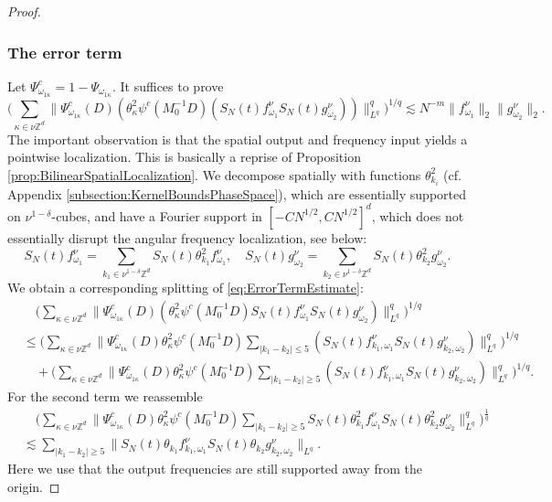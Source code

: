 \documentclass{amsart}
\numberwithin{equation}{section}
\theoremstyle{definition}
\newcommand{\Z}{\mathbb{Z}}
\begin{document}
\begin{proof}
\subsubsection*{The error term}

Let $\Psi_{\omega_{1 \kappa}}^c = 1-\Psi_{\omega_{1 \kappa}}$. It suffices to prove
\begin{equation}
\label{eq:ErrorTermEstimate}
   \big( \sum_{\kappa \in \nu \Z^d} \| \Psi_{\omega_{1 \kappa}}^{c}(D) (\theta_{\kappa}^2 \psi^c(M_0^{-1}D) (S_N(t) f_{\omega_1}^{\nu} S_N(t) g_{\omega_2}^{\nu} )) \|^q_{L^q} \big)^{1/q} \lesssim N^{-m} \| f_{\omega_1}^{\nu} \|_2 \| g_{\omega_2}^{\nu} \|_2.
\end{equation}
The important observation is that the spatial output and frequency input yields a pointwise localization. This is basically a reprise of Proposition \ref{prop:BilinearSpatialLocalization}. We decompose spatially with functions $\theta_{k_i}^2$ (cf. Appendix \ref{subsection:KernelBoundsPhaseSpace}), which are essentially supported on $\nu^{1-\delta}$-cubes, and have a Fourier support in $[-CN^{1/2},CN^{1/2}]^d$, which does not essentially disrupt the angular frequency localization, see below:
\begin{equation*}
    S_N(t) f_{\omega_1}^{\nu} = \sum_{k_1 \in \nu^{1-\delta} \Z^d} S_N(t) \theta_{k_1}^2 f_{\omega_1}^{\nu}, \quad S_N(t) g_{\omega_2}^{\nu} = \sum_{k_2 \in \nu^{1-\delta} \Z^{d}} S_N(t) \theta_{k_2}^2 g_{\omega_2}^{\nu}.
\end{equation*}
We obtain a corresponding splitting of \eqref{eq:ErrorTermEstimate}:
\begin{equation*}
\begin{split}
   &\quad \big( \sum_{\kappa \in \nu \Z^d} \| \Psi_{\omega_{1 \kappa}}^{c}(D) (\theta_{\kappa}^2 \psi^c(M_0^{-1}D) S_N(t) f_{\omega_1}^{\nu} S_N(t) g_{\omega_2}^{\nu} ) \|^q_{L^q} \big)^{1/q} \\
&\leq \big( \sum_{\kappa \in \nu \Z^d} \| \Psi_{\omega_{1 \kappa}}^{c}(D) \theta_{\kappa}^2 \psi^c(M_0^{-1}D) \sum_{|k_1-k_2| \leq 5} ( S_N(t) f_{k_1,\omega_1}^{\nu} S_N(t) g_{k_2,\omega_2}^{\nu} ) \|^q_{L^q} \big)^{1/q} \\
&\quad + \big( \sum_{\kappa \in \nu \Z^d} \| \Psi_{\omega_{1 \kappa}}^{c}(D) \theta_{\kappa}^2 \psi^c(M_0^{-1}D) \sum_{|k_1-k_2| \geq 5} ( S_N(t) f_{k_1,\omega_1}^{\nu} S_N(t) g_{k_2,\omega_2}^{\nu} ) \|^q_{L^q} \big)^{1/q}.
\end{split}
\end{equation*}
For the second term we reassemble
\begin{equation*}
\begin{split}
    &\quad \big( \sum_{\kappa \in \nu \Z^d} \| \Psi_{\omega_{1 \kappa}}^c(D) \theta_{\kappa}^2 \psi^c(M_0^{-1}D) \sum_{|k_1-k_2| \geq 5} S_N(t) \theta_{k_1}^2 f_{\omega_1}^{\nu} S_N(t) \theta_{k_2}^2 g_{\omega_2}^{\nu} \|_{L^q}^q \big)^{\frac{1}{q}} \\
    &\lesssim \sum_{|k_1-k_2| \geq 5} \| S_N(t) \theta_{k_1} f_{k_1,\omega_1}^{\nu} S_N(t) \theta_{k_2} g_{k_2,\omega_2}^{\nu} \|_{L^q}.
    \end{split}
\end{equation*}
Here we use that the output frequencies are still supported away from the origin.


\end{proof}
\end{document}
